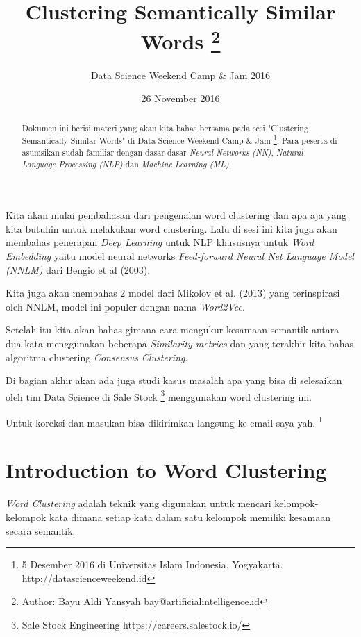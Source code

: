 \documentclass[a4paper,12pt]{tufte-handout}
\title{Clustering Semantically Similar Words
    \thanks{
        Author: Bayu Aldi Yansyah
        bay@artificialintelligence.id
    }
}
\author{Data Science Weekend Camp \& Jam 2016}
\date{26 November 2016} %
\begin{document}
\maketitle%

\marginnote{---}
\marginnote{\today{} \currenttime{}}
\marginnote{---}

\begin{abstract}
\noindent
Dokumen ini berisi materi yang akan kita bahas bersama pada sesi 
"Clustering Semantically Similar Words" di Data Science Weekend Camp 
\& Jam
\footnote{5 Desember 2016 di Universitas Islam Indonesia, 
Yogyakarta. http://datascienceweekend.id}.
Para peserta di asumsikan sudah familiar dengan dasar-dasar
\textit{Neural Networks (NN)}, 
\textit{Natural Language Processing (NLP)} dan 
\textit{Machine Learning (ML)}.
\end{abstract}


Kita akan mulai pembahasan dari pengenalan word clustering dan 
apa aja yang kita butuhin untuk melakukan word clustering.
Lalu di sesi ini kita juga akan membahas penerapan 
\textit{Deep Learning} untuk NLP khususnya untuk \textit{Word Embedding}
yaitu model neural networks
\textit{Feed-forward Neural Net Language Model (NNLM)} dari Bengio et al (2003).

Kita juga akan membahas 2 model dari Mikolov et al. (2013) 
yang terinspirasi oleh
NNLM, model ini populer dengan nama \textit{Word2Vec}. 

Setelah itu kita akan bahas gimana cara mengukur kesamaan semantik
antara dua kata menggunakan beberapa \textit{Similarity metrics} dan yang 
terakhir kita bahas algoritma clustering \textit{Consensus Clustering}.

Di bagian akhir akan ada juga studi kasus masalah apa yang bisa
di selesaikan oleh tim Data Science di Sale Stock
\footnote{Sale Stock Engineering https://careers.salestock.io/} 
menggunakan word clustering ini.

Untuk koreksi dan masukan bisa dikirimkan langsung ke email saya yah.
\textsuperscript{1}

\section{Introduction to Word Clustering}\label{sec:pengenalan}
\textit{Word Clustering} adalah teknik yang digunakan untuk 
mencari kelompok-kelompok kata dimana setiap kata dalam satu kelompok 
memiliki kesamaan secara semantik.\cite{sanfilippo1999eagles}
\end{document}
